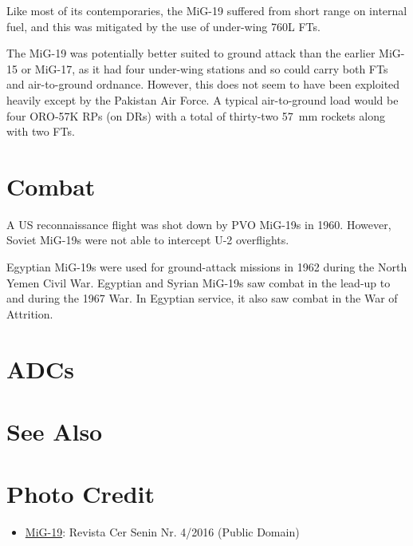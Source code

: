 Like most of its contemporaries, the MiG-19 suffered from short range on internal fuel, and this was mitigated by the use of under-wing 760L FTs.

The MiG-19 was potentially better suited to ground attack than the earlier MiG-15 or MiG-17, as it had four under-wing stations and so could carry both FTs and air-to-ground ordnance. However, this does not seem to have been exploited heavily except by the Pakistan Air Force. A typical air-to-ground load would be four ORO-57K RPs (on DRs) with a total of thirty-two 57~mm rockets along with two FTs.

\section{Combat}

A US reconnaissance flight was shot down by PVO MiG-19s in 1960. However, Soviet MiG-19s were not able to intercept U-2 overflights.

Egyptian MiG-19s were used for ground-attack missions in 1962 during the North Yemen Civil War. Egyptian and Syrian MiG-19s saw combat in the lead-up to and during the 1967 War. In Egyptian service, it also saw combat in the War of Attrition.

\section{ADCs}
\begin{adclist}
\end{adclist}

\section{See Also}
\begin{typelist}
\end{typelist}

\section{Photo Credit}
\begin{itemize}\raggedright
    \item \href{https://commons.wikimedia.org/wiki/File:MiG-19_Romania.png}{MiG-19}: Revista Cer Senin Nr\@. 4/2016 (Public Domain)
\end{itemize}
